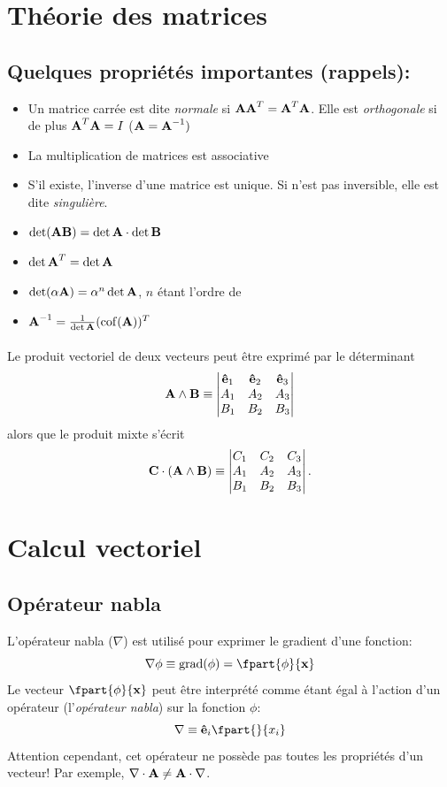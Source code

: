 \section{Théorie des matrices}
\subsection{Quelques propriétés importantes (rappels): }
\begin{itemize}
\item Un matrice carrée  est dite \emph{normale} si $\textbf{A}\textbf{A}^T=\textbf{A}^T\textbf{A}$. Elle est \emph{orthogonale} si de plus $\textbf{A}^T\textbf{A}=I$ ($\textbf{A}=\textbf{A}^{-1})$
\item La multiplication de matrices est associative
\item S'il existe, l'inverse d'une matrice  est unique. Si  n'est pas inversible, elle est dite \emph{singulière}.
\item $\det(\textbf{AB})=\det\textbf{A}\cdot\det\textbf{B}$
\item $\det \textbf{A}^T=\det\textbf{A}$
\item $\det(\alpha\textbf{A})=\alpha^n\det\textbf{A}$, $n$ étant l'ordre de 
\item $\textbf{A}^{-1}=\frac{1}{\det\textbf{A}}(\operatorname{cof}(\textbf{A}))^T$
\end{itemize}
\paragraph*{}
Le produit vectoriel de deux vecteurs peut être exprimé par le déterminant
$$\textbf{A}\wedge\textbf{B}\equiv
\begin{vmatrix}
\textbf{ê}_1 & \textbf{ê}_2 &\textbf{ê}_3\\
A_1 & A_2 &	 A_3\\
B_1 & B_2 & B_3\\
\end{vmatrix}$$
alors que le produit mixte s'écrit
$$\textbf{C}\cdot(\textbf{A}\wedge\textbf{B})\equiv
\begin{vmatrix}
  C_1&C_2&C_3\\
  A_1&A_2&A_3\\
  B_1&B_2&B_3\\
\end{vmatrix}.$$

\section{Calcul vectoriel}
\subsection{Opérateur nabla}
L'opérateur nabla ($\nabla$) est utilisé pour exprimer le gradient d'une fonction: $$\nabla\phi\equiv\mygrad(\phi)=\fpart{\phi}{\fv{x}}$$ Le vecteur $\fpart{\phi}{\fv{x}}$ peut être interprété comme étant égal à l'action d'un opérateur (l'\emph{opérateur nabla}) sur la fonction $\phi$:
$$\nabla\equiv \fv{ê}_i\fpart{}{x_i}$$
Attention cependant, cet opérateur ne possède pas toutes les propriétés d'un vecteur! Par exemple, $\nabla\cdot\textbf{A}\neq\textbf{A}\cdot\nabla$.
